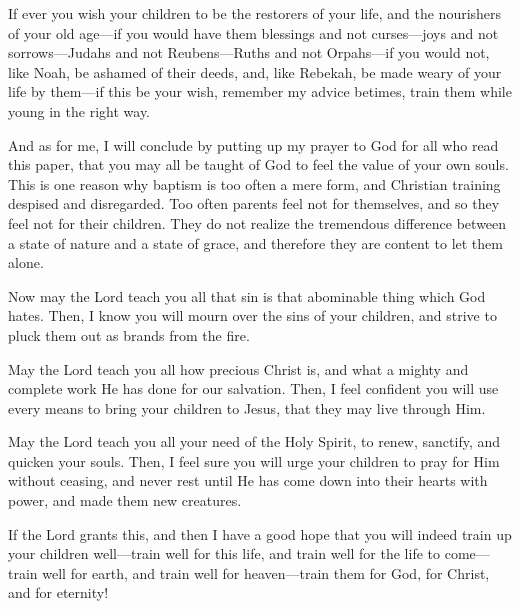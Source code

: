 \documentclass[
]{book}
\begin{document}
If ever you wish your children to be the restorers of your life, and the nourishers of your old age---if you would have them blessings and not curses---joys and not sorrows---Judahs and not Reubens---Ruths and not Orpahs---if you would not, like Noah, be ashamed of their deeds, and, like Rebekah, be made weary of your life by them---if this be your wish, remember my advice betimes, train them while young in the right way.

And as for me, I will conclude by putting up my prayer to God for all who read this paper, that you may all be taught of God to feel the value of your own souls. This is one reason why baptism is too often a mere form, and Christian training despised and disregarded. Too often parents feel not for themselves, and so they feel not for their children. They do not realize the tremendous difference between a state of nature and a state of grace, and therefore they are content to let them alone.

Now may the Lord teach you all that sin is that abominable thing which God hates. Then, I know you will mourn over the sins of your children, and strive to pluck them out as brands from the fire.

May the Lord teach you all how precious Christ is, and what a mighty and complete work He has done for our salvation. Then, I feel confident you will use every means to bring your children to Jesus, that they may live through Him.

May the Lord teach you all your need of the Holy Spirit, to renew, sanctify, and quicken your souls. Then, I feel sure you will urge your children to pray for Him without ceasing, and never rest until He has come down into their hearts with power, and made them new creatures.

If the Lord grants this, and then I have a good hope that you will indeed train up your children well---train well for this life, and train well for the life to come---train well for earth, and train well for heaven---train them for God, for Christ, and for eternity!
\end{document}
